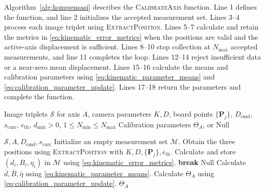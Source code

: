 \documentclass[journal]{IEEEtran}
\begin{document}
Algorithm~\ref{alg:kompensasi} describes the
\textsc{CalibrateAxis} function.
Line 1 defines the function, and line 2 initializes
the accepted measurement set.
Lines 3--4 process each image triplet using
\textsc{ExtractPosition}.
Lines 5--7 calculate and retain the metrics in
\eqref{eq:kinematic_error_metrics} when the positions
are valid and the active-axis displacement is sufficient.
Lines 8--10 stop collection at $N_{\mathrm{max}}$
accepted measurements, and line 11 completes the loop.
Lines 12--14 reject insufficient data or a near-zero
mean displacement.
Lines 15--16 calculate the means and calibration
parameters using
\eqref{eq:kinematic_parameter_means} and
\eqref{eq:calibration_parameter_update}.
Lines 17--18 return the parameters and complete
the function.

\begin{algorithm}[!t]
\caption{\textsc{CalibrateAxis} Function}
\label{alg:kompensasi}
\begin{algorithmic}[1]
\footnotesize

\Require Image triplets $\mathcal S$ for axis $A$,
camera parameters $K,D$, board points $\{\mathbf P_j\}$,
\Statex \hspace{2.5em}
$D_{\mathrm{cmd}}$, $s_{\mathrm{curr}}$,
$\epsilon_{\mathrm{th}}$, $d_{\mathrm{min}}>0$,
$1\le N_{\mathrm{min}}\le N_{\mathrm{max}}$
\Ensure Calibration parameters $\Theta_A$,
or $\text{Null}$

{$\mathcal S,A,D_{\mathrm{cmd}},s_{\mathrm{curr}}$}
    \State Initialize an empty measurement set
        $\mathcal M$.
        \State Obtain the three positions using
            \textsc{ExtractPosition} with
            $K,D,\{\mathbf P_j\},\epsilon_{\mathrm{th}}$.
            \State Calculate and store
                $(d_i,B_i,\eta_i)$ in $\mathcal M$
                using \eqref{eq:kinematic_error_metrics}.
        \EndIf
            \State \textbf{break}
        \EndIf
    \EndFor
        \State \Return $\text{Null}$
    \EndIf
    \State Calculate $\bar d,\bar B,\bar\eta$
        using \eqref{eq:kinematic_parameter_means}.
    \State Calculate $\Theta_A$ using
        \eqref{eq:calibration_parameter_update}.
    \State \Return $\Theta_A$
\EndFunction

\end{algorithmic}
\end{algorithm}
\end{document}
